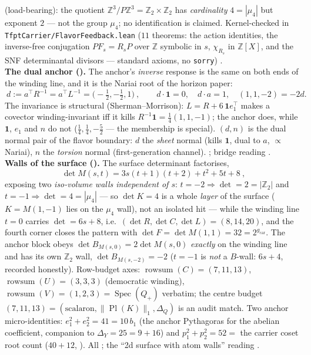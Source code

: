 \documentclass[11pt,a4paper]{article}
\newcommand{\gcar}{g_{\mathrm{car}}}
\newcommand{\Z}{\mathbb{Z}}
\theoremstyle{definition}
\begin{document}
\begin{winbox}
{(load-bearing):} the quotient $\Z^3/P\Z^3 = \Z_2\times\Z_2$ has \emph{cardinality} $4 = |\mu_4|$ but
exponent $2$ --- not the group $\mu_4$; no identification is claimed.  Kernel-checked in
\texttt{TfptCarrier/FlavorFeedback.lean} ($11$ theorems: the action identities, the inverse-free
conjugation $P F_s = R_s P$ over $\Z$ symbolic in $s$, $\chi_{R_s}$ in $\Z[X]$, and the SNF
determinantal divisors --- standard axioms, no \texttt{sorry}) \mE.
\smallskip\\
\noindent\textbf{The dual anchor ().} The anchor's \emph{inverse} response is the
same on both ends of the winding line, and it is the Nariai root of the horizon paper:
\[
  \boxed{\ d:=a^\top R^{-1}=a^\top L^{-1}=\bigl(-\tfrac12,-\tfrac12,1\bigr)\ },\qquad
  d\cdot\mathbf 1=0,\quad d\cdot a=1,\quad (1,1,-2)=-2d .
\]
The invariance is structural (Sherman--Morrison): $L=R+6\,\mathbf 1e_1^\top$ makes a covector
winding-invariant iff it kills $R^{-1}\mathbf 1=\tfrac14(1,1,-1)$; the anchor does, while $\mathbf 1$,
$e_1$ and $n$ do not ($\tfrac14,\tfrac14,-\tfrac52$ --- the membership is special). $(d,n)$ is the dual
normal pair of the flavor boundary: $d$ the \emph{sheet} normal (kills $\mathbf 1$, dual to $a$,
$\propto$ Nariai), $n$ the \emph{torsion} normal (first-generation channel). \mE; bridge reading \mC.
\smallskip\\
\noindent\textbf{Walls of the surface ().} The surface determinant factorises,
\[
  \boxed{\ \det M(s,t)=3s(t{+}1)(t{+}2)+t^2+5t+8\ },
\]
exposing two \emph{iso-volume walls independent of $s$}: $t=-2\Rightarrow\det=2=|\Z_2|$ and
$t=-1\Rightarrow\det=4=|\mu_4|$ --- so $\det K=4$ is a whole \emph{layer} of the surface ($K=M(1,-1)$ lies
on the $\mu_4$ wall), not an isolated hit --- while the winding line $t=0$ carries $\det=6s+8$, i.e.\
$(\det R,\det C,\det L)=(8,14,20)$, and the fourth corner closes the pattern with
$\det F=\det M(1,1)=32=2^{\gcar}$. The anchor block obeys $\det B_{M(s,0)}=2\det M(s,0)$ \emph{exactly} on
the winding line and has its own $\Z_2$ wall, $\det B_{M(s,-2)}=-2$ ($t=-1$ is \emph{not} a $B$-wall:
$6s+4$, recorded honestly). Row-budget axes: $\operatorname{rowsum}(C)=(7,11,13)$,
$\operatorname{rowsum}(U)=(3,3,3)$ (democratic winding), $\operatorname{rowsum}(V)=(1,2,3)=
\operatorname{Spec}(Q_+)$ verbatim; the centre budget $(7,11,13)=(\text{scalaron},\|\operatorname{Pl}(K)\|_1,
\Delta_Q)$ is an audit match. Two anchor micro-identities: $e_1^2+e_2^2=41=10\,b_1$ (the anchor Pythagoras
for the abelian coefficient, companion to $\Delta_Y=25=9{+}16$) and $p_1^2+p_2^2=52=$ the carrier coset
root count ($40{+}12$, \veri{v128\_graded\_hull.py}). All \mE; the ``2d surface with atom walls'' reading \mC.
\end{winbox}
\end{document}

